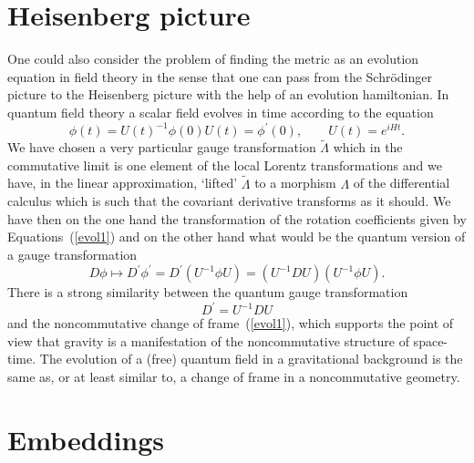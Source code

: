 \documentclass[12pt,a4paper]{article}
\def\t#1{\tilde #1}
\newcommand{\initiate}{\setcounter{equation}{0}}
\begin{document}
\initiate
\section{Heisenberg  picture}                            \label{Heis}

One could also consider the problem of finding the metric as an evolution
equation in field theory in the sense that one can pass from the
Schr\"odinger picture to the Heisenberg picture with the help of an
evolution hamiltonian. In quantum field theory a scalar field evolves
in time according to the equation
$$
\phi(t) = U(t)^{-1}\phi(0)U(t) = \phi^\prime (0), \qquad U(t) = e^{iHt}.
$$
We have chosen a very particular gauge transformation $\t{\Lambda}$ which
in the commutative limit is one element of the local Lorentz
transformations and we have, in the linear approximation, `lifted'
$\t{\Lambda}$ to a morphism $\Lambda$ of the differential calculus
which is such that the covariant derivative transforms as it
should. We have then on the one hand the transformation of the
rotation coefficients given by Equations~(\ref{evol1}) and on the
other hand what would be the quantum version of a gauge transformation
$$
D\phi \mapsto D^\prime \phi^\prime = 
D^\prime (U^{-1}\phi U) = (U^{-1}D U) (U^{-1}\phi U).
$$
There is a strong similarity between the quantum gauge transformation 
$$
D^\prime = U^{-1}D U
$$
and the noncommutative change of frame~(\ref{evol1}), which supports
the point of view that gravity is a manifestation of the
noncommutative structure of space-time. The evolution of a (free)
quantum field in a gravitational background is the same as, or at
least similar to, a change of frame in a noncommutative geometry.


\initiate
\section{Embeddings}
\end{document}
